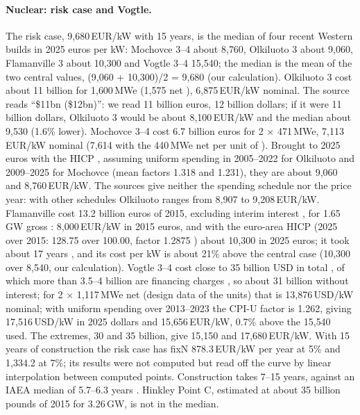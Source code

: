 \paragraph{Nuclear: risk case and Vogtle.} The risk case, 9{,}680\,EUR/kW with 15 years, is the median of four recent Western builds in 2025 euros per kW: Mochovce 3--4 about 8{,}760, Olkiluoto 3 about 9{,}060, Flamanville 3 about 10{,}300 and Vogtle 3--4 15{,}540; the median is the mean of the two central values, (9{,}060 + 10{,}300)/2 = 9{,}680 (our calculation). Olkiluoto 3 cost about 11 billion \citep{NEIOL3} for 1{,}600\,MWe (1{,}575 net \citep{WNAfinland}), 6{,}875\,EUR/kW nominal. The source reads ``\$11bn (\$12bn)'': we read 11 billion euros, 12 billion dollars; if it were 11 billion dollars, Olkiluoto 3 would be about 8{,}100\,EUR/kW and the median about 9{,}530 (1.6\% lower). Mochovce 3--4 cost 6.7 billion euros \citep{WNNMochovce4} for 2 $\times$ 471\,MWe, 7{,}113\,EUR/kW nominal (7{,}614 with the 440\,MWe net per unit of \citealt{WNAslovakia}). Brought to 2025 euros with the HICP \citep{EurostatHICP}, assuming uniform spending in 2005--2022 for Olkiluoto and 2009--2025 for Mochovce (mean factors 1.318 and 1.231), they are about 9{,}060 and 8{,}760\,EUR/kW. The sources give neither the spending schedule nor the price year: with other schedules Olkiluoto ranges from 8{,}907 to 9{,}208\,EUR/kW. Flamanville cost 13.2 billion euros of 2015, excluding interim interest \citep{EDFFlamanville2022}, for 1.65\,GW gross \citep{Folz2019}: 8{,}000\,EUR/kW in 2015 euros, and with the euro-area HICP (2025 over 2015: 128.75 over 100.00, factor 1.2875 \citep{EurostatHICP}) about 10{,}300 in 2025 euros; it took about 17 years \citep{Flamanville2024}, and its cost per kW is about 21\% above the central case (10{,}300 over 8{,}540, our calculation). Vogtle 3--4 cost close to 35 billion USD in total \citep{EnergytechVogtle}, of which more than 3.5--4 billion are financing charges \citep{IEEFAVogtle}, so about 31 billion without interest; for 2 $\times$ 1{,}117\,MWe net (design data of the units) that is 13{,}876\,USD/kW nominal; with uniform spending over 2013--2023 the CPI-U factor is 1.262, giving 17{,}516\,USD/kW in 2025 dollars and 15{,}656\,EUR/kW, 0.7\% above the 15{,}540 used. The extremes, 30 and 35 billion, give 15{,}150 and 17{,}680\,EUR/kW. With 15 years of construction the risk case has fixN 878.3\,EUR/kW per year at 5\% and 1{,}334.2 at 7\%; its results were not computed but read off the curve by linear interpolation between computed points. Construction takes 7--15 years, against an IAEA median of 5.7--6.3 years \citep{Ritchie2023}. Hinkley Point C, estimated at about 35 billion pounds of 2015 for 3.26\,GW, is not in the median.

